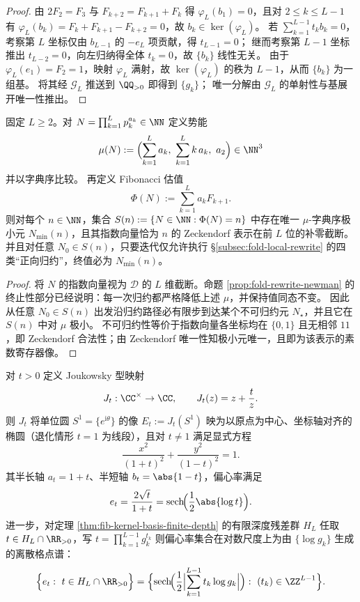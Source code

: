 \begin{proof}
由 \(2F_2=F_3\) 与 \(F_{k+2}=F_{k+1}+F_k\) 得 \(\varphi_L(b_1)=0\)，且对 \(2\le k\le L-1\) 有
\(
\varphi_L(b_k)=F_k+F_{k+1}-F_{k+2}=0
\)，故 \(b_k\in\ker(\varphi_L)\)。
若 \(\sum_{k=1}^{L-1} t_k b_k=0\)，考察第 \(L\) 坐标仅由 \(b_{L-1}\) 的 \(-e_L\) 项贡献，得 \(t_{L-1}=0\)；
继而考察第 \(L-1\) 坐标推出 \(t_{L-2}=0\)，向左归纳得全体 \(t_k=0\)，故 \(\{b_k\}\) 线性无关。
由于 \(\varphi_L(e_1)=F_2=1\)，映射 \(\varphi_L\) 满射，故 \(\ker(\varphi_L)\) 的秩为 \(L-1\)，从而 \(\{b_k\}\) 为一组基。
将其经 \(\mathcal G_L\) 推送到 \(\QQ_{>0}\) 即得到 \(\{g_k\}\)；
唯一分解由 \(\mathcal G_L\) 的单射性与基展开唯一性推出。
\end{proof}

\begin{proposition}\label{prop:potential-lexmin-zeckendorf}
固定 \(L\ge 2\)。对 \(N=\prod_{k=1}^{L}p_k^{a_k}\in\NN\) 定义势能
\[
\mu(N):=\Bigl(\sum_{k=1}^{L}a_k,\ \sum_{k=1}^{L}k\,a_k,\ a_2\Bigr)\in\NN^3
\]
并以字典序比较。
再定义 Fibonacci 估值
\[
\Phi(N):=\sum_{k=1}^{L} a_k F_{k+1}.
\]
则对每个 \(n\in\NN\)，集合 \(S(n):=\{N\in\NN:\Phi(N)=n\}\) 中存在唯一 \(\mu\)-字典序极小元 \(N_{\min}(n)\)，且其指数向量恰为 \(n\) 的 Zeckendorf 表示在前 \(L\) 位的补零截断。
并且对任意 \(N_0\in S(n)\)，只要迭代仅允许执行 \S\ref{subsec:fold-local-rewrite} 的四类“正向归约”，终值必为 \(N_{\min}(n)\)。
\end{proposition}

\begin{proof}
将 \(N\) 的指数向量视为 \(\mathcal D\) 的 \(L\) 维截断。命题 \ref{prop:fold-rewrite-newman} 的终止性部分已经说明：每一次归约都严格降低上述 \(\mu\)，并保持值同态不变。
因此从任意 \(N_0\in S(n)\) 出发沿归约路径必有限步到达某个不可归约元 \(N_\star\)，并且它在 \(S(n)\) 中对 \(\mu\) 极小。
不可归约性等价于指数向量各坐标均在 \(\{0,1\}\) 且无相邻 \(11\)，即 Zeckendorf 合法性；由 Zeckendorf 唯一性知极小元唯一，且即为该表示的素数寄存器像。
\end{proof}

\begin{theorem}\label{thm:joukowsky-ellipse-eccentricity}
对 \(t>0\) 定义 Joukowsky 型映射
\[
J_t:\CC^\times\to\CC,\qquad J_t(z)=z+\frac{t}{z}.
\]
则 \(J_t\) 将单位圆 \(S^1=\{e^{\mathrm{i}\theta}\}\) 的像 \(E_t:=J_t(S^1)\) 映为以原点为中心、坐标轴对齐的椭圆（退化情形 \(t=1\) 为线段），且对 \(t\neq 1\) 满足显式方程
\[
\frac{x^2}{(1+t)^2}+\frac{y^2}{(1-t)^2}=1.
\]
其半长轴 \(a_t=1+t\)、半短轴 \(b_t=\abs{1-t}\)，偏心率满足
\[
e_t=\frac{2\sqrt t}{1+t}
=\operatorname{sech}\!\Bigl(\frac12\abs{\log t}\Bigr).
\]
进一步，对定理 \ref{thm:fib-kernel-basis-finite-depth} 的有限深度残差群 \(H_L\) 任取 \(t\in H_L\cap\RR_{>0}\)，写
\(
t=\prod_{k=1}^{L-1} g_k^{t_k}
\)
则偏心率集合在对数尺度上为由 \(\{\log g_k\}\) 生成的离散格点谱：
\[
\Bigl\{e_t:\ t\in H_L\cap\RR_{>0}\Bigr\}
=\Bigl\{\operatorname{sech}\!\Bigl(\frac12\Bigl|\sum_{k=1}^{L-1} t_k\log g_k\Bigr|\Bigr):\ (t_k)\in\ZZ^{L-1}\Bigr\}.
\]
\end{theorem}

